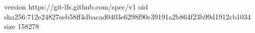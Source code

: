 version https://git-lfs.github.com/spec/v1
oid sha256:712e24827eeb58ff4dbacad0403e6298f90c39191a2b864f23b99d1912cb1034
size 158278

